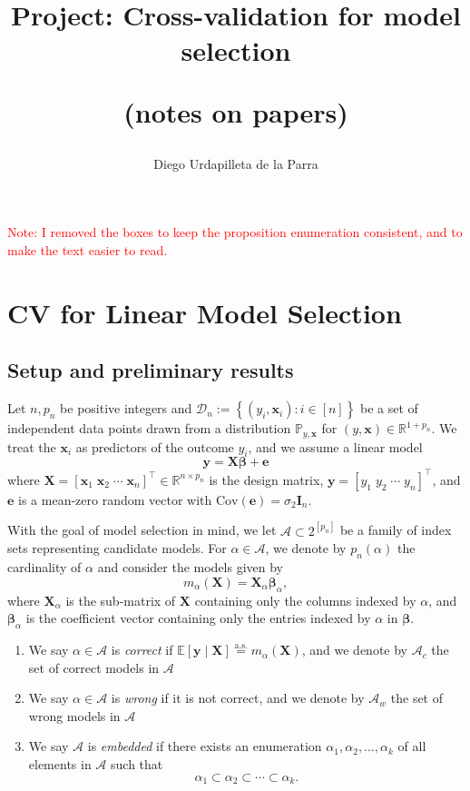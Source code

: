 \documentclass[12pt, letter paper]{article}
\title{Project: Cross-validation for model selection

(notes on papers)}
\author{Diego Urdapilleta de la Parra}
\newcommand{\1}{\mathmybb{1}}
\newcommand{\R}{\mathbb{R}}
\newcommand{\0}{\emptyset}
\newcommand{\prob}{\mathbb{P}}
\newcommand{\Ep}[1]{\mathbb{E}\left[ #1 \right]}
\newcommand{\paren}[1]{\left(#1 \right)}
\newcommand{\sqbr}[1]{\left[#1 \right]}
\newcommand{\set}[1]{\left\{ #1 \right\}}
\newcommand{\data}{\mathcal{D}_{n}}
\newcommand{\Acal}{\mathcal{A}}
\newcommand{\aseq}{\stackrel{\mathrm{a.s.}}{=}}
\newcommand{\X}{\boldsymbol{X}}
\newcommand{\x}{\boldsymbol{x}}
\newcommand{\y}{\boldsymbol{y}}
\newcommand{\e}{\boldsymbol{e}}
\newcommand{\Cov}[1]{\mathrm{Cov}\paren{#1}}
\newcommand{\bbeta}{\boldsymbol{\beta}}
\begin{document}
\maketitle

\textcolor{red}{Note: I removed the boxes to keep the proposition enumeration consistent, and to make the text easier to read.}

\tableofcontents

\newpage
\section{CV for Linear Model Selection}
\subsection{Setup and preliminary results}
Let \(n,p_{n}\) be positive integers and \(\data := \set{\paren{y_{i}, \x_{i}}:i\in [n]}\) be a set of independent data points drawn from a distribution \(\prob_{y, \x}\) for \((y, \x)\in\R^{1+p_{n}}\). We treat the \(\x_{i}\) as predictors of the outcome \(y_{i}\), and we assume a linear model
\[\y = \X\bbeta + \e\]
where \(\X = {[\x_{1}\;\x_{2}\;\cdots\;\x_{n}]}^{\top}\in\R^{n\times p_{n}}\) is the design matrix, \(\y = \sqbr{y_{1}\; y_{2}\;\cdots\; y_{n}}^{\top}\), and \(\e\) is a mean-zero random vector with \(\Cov{\e} = \sigma_{2}\boldsymbol{I}_{n}\).

With the goal of model selection in mind, we let \(\Acal\subset2^{[p_{n}]}\) be a family of index sets representing candidate models. For \(\alpha\in\Acal\), we denote by \(p_{n}(\alpha)\) the cardinality of \(\alpha\) and consider the models given by
\[m_{\alpha}(\X) = \X_{\alpha}\bbeta_{\alpha},\]
where \(\X_{\alpha}\) is the sub-matrix of \(\X\) containing only the columns indexed by \(\alpha\), and \(\bbeta_{\alpha}\) is the coefficient vector containing only the entries indexed by \(\alpha\) in \(\bbeta\).
\begin{enumerate}
    \item We say \(\alpha\in\Acal\) is \emph{correct} if \(\Ep{\y\mid\X}\aseq m_{\alpha}(\X)\), and we denote by \(\Acal_{c}\) the set of correct models in \(\Acal\)
    \item We say \(\alpha\in\Acal\) is \emph{wrong} if it is not correct, and we denote by \(\Acal_{w}\) the set of wrong models in \(\Acal\)
    \item We say \(\Acal\) is \emph{embedded} if there exists an enumeration \(\alpha_{1}, \alpha_{2}, \ldots, \alpha_{k}\) of all elements in \(\Acal\) such that \[\alpha_{1}\subset\alpha_{2}\subset\cdots\subset\alpha_{k}.\]
\end{enumerate}
\end{document}
